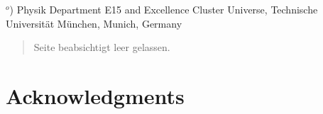 \documentclass[encoding=utf8,british]{tumphthesis}
\newcommand{\titleheader}{Analysis of \Kr concentration in the liquid argon of GERDA Phase II} %
\begin{document}
\begin{titlepage}
\begin{center}
$^o$)  Physik Department E15 and Excellence Cluster Universe, Technische  Universit{\"a}t M{\"u}nchen, Munich, Germany\\[1mm]                           
\vspace*{20mm}

\begin{abstract}
Seite beabsichtigt leer gelassen.
\end{abstract}
\end{center}
\vfill
\end{titlepage}
\vfill

\setcounter{page}{1}
\newpage


\section*{Acknowledgments}






\@openrightfalse\makeatletter
\end{document}
